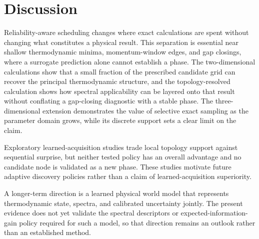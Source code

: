 \section{Discussion}
Reliability-aware scheduling changes where exact calculations are spent without changing what constitutes a physical result.  This separation is essential near shallow thermodynamic minima, momentum-window edges, and gap closings, where a surrogate prediction alone cannot establish a phase.  The two-dimensional calculations show that a small fraction of the prescribed candidate grid can recover the principal thermodynamic structure, and the topology-resolved calculation shows how spectral applicability can be layered onto that result without conflating a gap-closing diagnostic with a stable phase.  The three-dimensional extension demonstrates the value of selective exact sampling as the parameter domain grows, while its discrete support sets a clear limit on the claim.

Exploratory learned-acquisition studies trade local topology support against sequential surprise, but neither tested policy has an overall advantage and no candidate node is validated as a new phase.  These studies motivate future adaptive discovery policies rather than a claim of learned-acquisition superiority.

A longer-term direction is a learned physical world model that represents thermodynamic state, spectra, and calibrated uncertainty jointly.  The present evidence does not yet validate the spectral descriptors or expected-information-gain policy required for such a model, so that direction remains an outlook rather than an established method.
